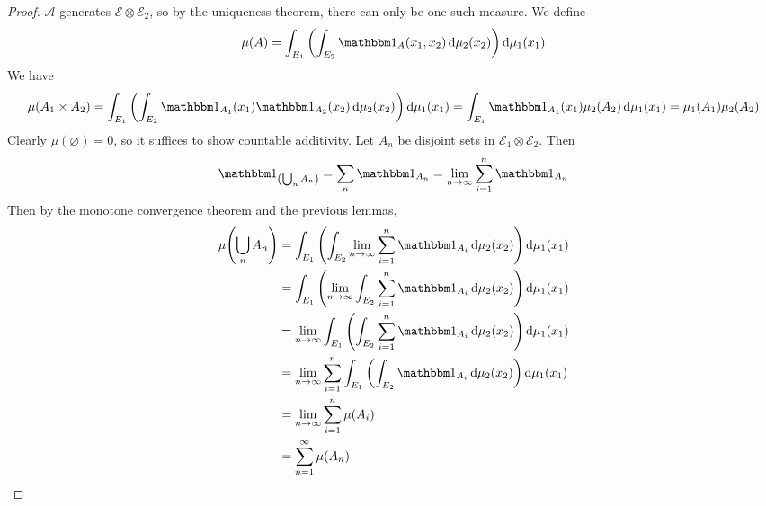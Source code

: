 \begin{proof}
	\( \mathcal A \) generates \( \mathcal E \otimes \mathcal E_2 \), so by the uniqueness theorem, there can only be one such measure.
	We define
	\[ \mu(A) = \int_{E_1} \qty( \int_{E_2} \mathbbm 1_A(x_1,x_2) \dd{\mu_2(x_2)} ) \dd{\mu_1(x_1)} \]
	We have
	\[ \mu(A_1 \times A_2) = \int_{E_1} \qty( \int_{E_2} \mathbbm 1_{A_1}(x_1) \mathbbm 1_{A_2}(x_2) \dd{\mu_2(x_2)} ) \dd{\mu_1(x_1)} = \int_{E_1} \mathbbm 1_{A_1}(x_1) \mu_2(A_2) \dd{\mu_1(x_1)} = \mu_1(A_1) \mu_2(A_2) \]
	Clearly \( \mu(\varnothing) = 0 \), so it suffices to show countable additivity.
	Let \( A_n \) be disjoint sets in \( \mathcal E_1 \otimes \mathcal E_2 \).
	Then
	\[ \mathbbm 1_{\qty(\bigcup_n A_n)} = \sum_n \mathbbm 1_{A_n} = \lim_{n \to \infty} \sum_{i=1}^n \mathbbm 1_{A_n} \]
	Then by the monotone convergence theorem and the previous lemmas,
	\begin{align*}
		\mu\qty(\bigcup_n A_n) &= \int_{E_1} \qty( \int_{E_2} \lim_{n \to \infty} \sum_{i=1}^n \mathbbm 1_{A_i} \dd{\mu_2(x_2)} ) \dd{\mu_1(x_1)} \\
		&= \int_{E_1} \qty( \lim_{n \to \infty} \int_{E_2} \sum_{i=1}^n \mathbbm 1_{A_i} \dd{\mu_2(x_2)} ) \dd{\mu_1(x_1)} \\
		&= \lim_{n \to \infty} \int_{E_1} \qty( \int_{E_2} \sum_{i=1}^n \mathbbm 1_{A_i} \dd{\mu_2(x_2)} ) \dd{\mu_1(x_1)} \\
		&= \lim_{n \to \infty} \sum_{i=1}^n \int_{E_1} \qty( \int_{E_2} \mathbbm 1_{A_i} \dd{\mu_2(x_2)} ) \dd{\mu_1(x_1)} \\
		&= \lim_{n \to \infty} \sum_{i=1}^n \mu(A_i) \\
		&= \sum_{n=1}^\infty \mu(A_n)
	\end{align*}
\end{proof}
